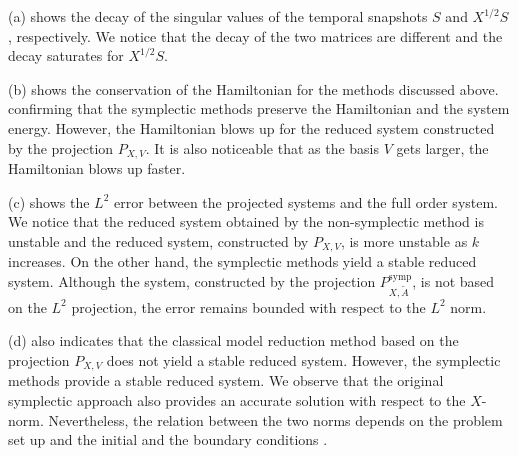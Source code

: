 (a) shows the decay of the singular values of the temporal snapshots $S$ and $X^{1/2}S$, respectively. We notice that the decay of the two matrices are different and the decay saturates for $X^{1/2}S$.

(b) shows the conservation of the Hamiltonian for the methods discussed above. confirming that the symplectic methods preserve the Hamiltonian and the system energy. However, the Hamiltonian blows up for the reduced system constructed by the projection $P_{X,V}$. It is also noticeable that as the basis $V$ gets larger, the Hamiltonian blows up faster.

(c) shows the $L^2$ error between the projected systems and the full order system. We notice that the reduced system obtained by the non-symplectic method is unstable and the reduced system, constructed by $P_{X,V}$, is more unstable as $k$ increases. On the other hand, the symplectic methods yield a stable reduced system. Although the system, constructed by the projection $P^{\text{symp}}_{X,\tilde A}$, is not based on the $L^2$ projection, the error remains bounded with respect to the $L^2$ norm. 

(d) also indicates that the classical model reduction method based on the projection $P_{X,V}$ does not yield a stable reduced system. However, the symplectic methods provide a stable reduced system. We observe that the original symplectic approach also provides an accurate solution with respect to the $X$-norm. Nevertheless, the relation between the two norms depends on the problem set up and the initial and the boundary conditions \cite{DEPARIS20094359}.


